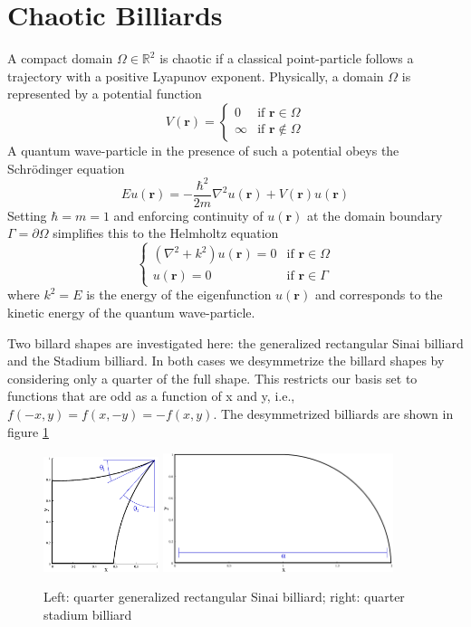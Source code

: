 \documentclass{report}
\newcommand{\rr}[0]{\mathbf{r}}
\begin{document}
\section{Chaotic Billiards}
\label{sec:billiards}
A compact domain $\Omega \in \mathbb{R}^{2}$ is chaotic if a classical point-particle follows a trajectory with a positive Lyapunov exponent. Physically, a domain $\Omega$ is represented by a potential function
\[
V(\rr) =\begin{cases}
0 & \text{if } \rr \in \Omega\\
\infty & \text{if } \rr \notin \Omega
\end{cases}
\]
A quantum wave-particle in the presence of such a potential obeys the Schrödinger equation
\[
E u(\rr) = - \frac{\hbar^{2}}{2m} \nabla^{2} u(\rr) + V(\rr) u(\rr)
\]
Setting $\hbar = m = 1$ and enforcing continuity of $u(\rr)$ at the domain boundary $\Gamma = \partial \Omega$ simplifies this to the Helmholtz equation
\begin{equation}
\label{eq:helmholtz}
\begin{cases}
(\nabla^{2} + k^{2})u(\rr) = 0 & \text{if } \rr \in \Omega\\
  u(\rr) = 0 & \text{if } \rr \in \Gamma
\end{cases}
\end{equation}
where $k^{2} = E$ is the energy of the eigenfunction $u(\rr)$ and corresponds to the kinetic energy of the quantum wave-particle.

Two billard shapes are investigated here: the generalized rectangular Sinai billiard and the Stadium billiard. In both cases we desymmetrize the billard shapes by considering only a quarter of the full shape. This restricts our basis set to functions that are odd as a function of x and y, i.e., $f(-x,y) = f(x,-y) = -f(x,y)$. The desymmetrized billiards are shown in figure \ref{fig:billiards}

\begin{figure}[h!]
  \begin{center}
    \includegraphics[width=0.3\textwidth]{figs/domains/qugrs_fig.eps}
    \includegraphics[width=0.6\textwidth]{figs/domains/qust_fig.eps}
    \caption{Left: quarter generalized rectangular Sinai billiard; right: quarter stadium billiard}
    \label{fig:billiards}
  \end{center}
\end{figure}
\end{document}
